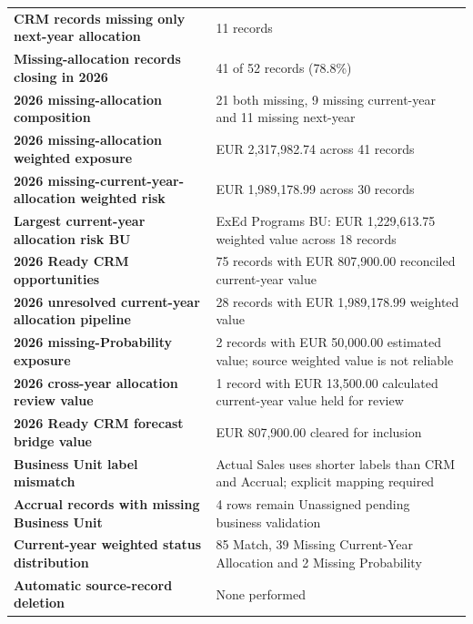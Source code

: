 \documentclass[11pt,a4paper]{article}
\begin{document}
\begin{tabularx}{\textwidth}{
    >{\raggedright\arraybackslash\bfseries\color{AaltoNavy}}p{7cm}
    X
}
CRM records missing only next-year allocation
&
11 records
\\

Missing-allocation records closing in 2026
&
41 of 52 records (78.8\%)
\\

2026 missing-allocation composition
&
21 both missing, 9 missing current-year and 11 missing next-year
\\

2026 missing-allocation weighted exposure
&
EUR 2,317,982.74 across 41 records
\\

2026 missing-current-year-allocation weighted risk
&
EUR 1,989,178.99 across 30 records
\\

Largest current-year allocation risk BU
&
ExEd Programs BU: EUR 1,229,613.75 weighted value across 18 records
\\

2026 Ready CRM opportunities
&
75 records with EUR 807,900.00 reconciled current-year value
\\

2026 unresolved current-year allocation pipeline
&
28 records with EUR 1,989,178.99 weighted value
\\

2026 missing-Probability exposure
&
2 records with EUR 50,000.00 estimated value; source weighted value is not reliable
\\

2026 cross-year allocation review value
&
1 record with EUR 13,500.00 calculated current-year value held for review
\\

2026 Ready CRM forecast bridge value
&
EUR 807,900.00 cleared for inclusion
\\

Business Unit label mismatch
&
Actual Sales uses shorter labels than CRM and Accrual; explicit mapping required
\\

Accrual records with missing Business Unit
&
4 rows remain Unassigned pending business validation
\\

Current-year weighted status distribution
&
85 Match, 39 Missing Current-Year Allocation and 2 Missing Probability
\\

Automatic source-record deletion
&
None performed
\\

\bottomrule

\end{tabularx}
\end{document}
